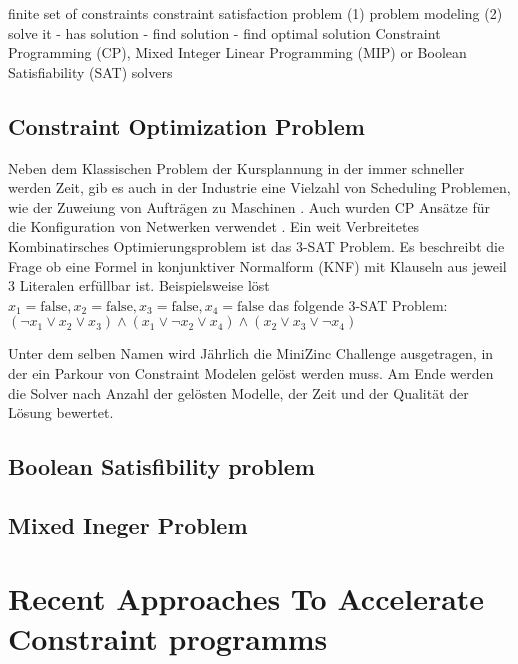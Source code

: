 finite set of constraints \cite[1]{aptjo} constraint satisfaction problem
\cite[1]{aptjo} (1) problem modeling (2) solve it - has solution - find solution
- find optimal solution
\cite*[postnote]{aptjo}
Constraint Programming (CP), Mixed Integer Linear Programming (MIP) or Boolean
Satisfiability (SAT) solvers



\subsection{Constraint Optimization Problem}
\label{sec: Constraint Optimization Problem}

Neben dem Klassischen Problem der Kursplannung \cite{duboi96jo} in der immer
schneller werden Zeit, gib es auch in der Industrie eine Vielzahl von Scheduling
Problemen, wie der Zuweiung von Aufträgen zu Maschinen \cite{gedik16jo}. Auch
wurden CP Ansätze für die Konfiguration von Netwerken verwendet \cite{ardisjo}.
Ein weit Verbreitetes Kombinatirsches Optimierungsproblem ist das 3-SAT Problem.
Es beschreibt die Frage ob eine Formel in konjunktiver Normalform (KNF) mit
Klauseln aus jeweil 3 Literalen erfüllbar ist.  
Beispielsweise löst 
$x_1=\mathrm{false},x_2=\mathrm{false},x_3=\mathrm{false},x_4=\mathrm{false}$
das folgende 3-SAT Problem: 
$(\lnot x_1\lor x_2\lor x_3)\land(x_1\lor\lnot x_2\lor x_4)\land(x_2\lor x_3\lor\lnot x_4)$

Unter dem selben Namen wird Jährlich die MiniZinc Challenge ausgetragen, in der
ein Parkour von Constraint Modelen gelöst werden muss. Am Ende werden die Solver
nach Anzahl der gelösten Modelle, der Zeit und der Qualität der Lösung bewertet. \cite{keylist}

\subsection{Boolean Satisfibility problem}
\label{sec: Boolean Satisfibility problem}


\subsection{Mixed Ineger Problem}
\label{sec: Mixed Ineger Problem}


\section{Recent Approaches To Accelerate Constraint programms}
\label{sec:Recent Approaches To Accelerate Constraint programms}



